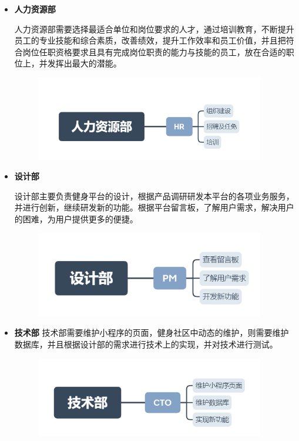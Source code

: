 \documentclass[UTF8,12pt]{ctexart}
\numberwithin{figure}{section}%
\begin{document}
\begin{spacing}{2}
\begin{itemize}
	\item \textbf{人力资源部}
	
	人力资源部需要选择最适合单位和岗位要求的人才，通过培训教育，不断提升员工的专业技能和综合素质，改善绩效，提升工作效率和员工价值，并且把符合岗位任职资格要求且具有完成岗位职责的能力与技能的员工，放在合适的职位上，并发挥出最大的潜能。
	\begin{figure}[!htb]
		\centering
		\includegraphics[width=10cm]{fig/14}
	\end{figure}
	
	
	\item \textbf{设计部}
	
	设计部主要负责健身平台的设计，根据产品调研研发本平台的各项业务服务，并进行创新，继续研发新的功能。根据平台留言板，了解用户需求，解决用户的困难，为用户提供更多的便捷。
	\begin{figure}[!htb]
		\centering
		\includegraphics[width=10cm]{fig/15}
	\end{figure}
		
	
	\item \textbf{技术部}	
	技术部需要维护小程序的页面，健身社区中动态的维护，则需要维护数据库，并且根据设计部的需求进行技术上的实现，并对技术进行测试。
	\begin{figure}[!htb]
		\centering
		\includegraphics[width=10cm]{fig/16}
	\end{figure}
	

\end{itemize}
\end{spacing}
\end{document}

